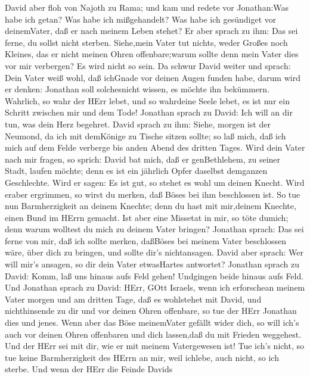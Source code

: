  David aber floh von Najoth zu Rama; und kam und redete vor
Jonathan:Was habe ich getan? Was habe ich mißgehandelt? Was habe ich
gesündiget vor deinemVater, daß er nach meinem Leben stehet?
 Er aber sprach zu ihm: Das sei ferne, du sollst nicht
sterben. Siehe,mein Vater tut nichts, weder Großes noch Kleines, das er
nicht meinen Ohren offenbare;warum sollte denn mein Vater dies vor mir
verbergen? Es wird nicht so sein.  Da schwur David weiter
und sprach: Dein Vater weiß wohl, daß ichGnade vor deinen Augen funden
habe, darum wird er denken: Jonathan soll solchesnicht wissen, es möchte
ihn bekümmern. Wahrlich, so wahr der HErr lebet, und so wahrdeine Seele
lebet, es ist nur ein Schritt zwischen mir und dem Tode! 
Jonathan sprach zu David: Ich will an dir tun, was dein Herz begehret.
 David sprach zu ihm: Siehe, morgen ist der Neumond, da ich
mit demKönige zu Tische sitzen sollte; so laß mich, daß ich mich auf dem
Felde verberge bis anden Abend des dritten Tages.  Wird dein
Vater nach mir fragen, so sprich: David bat mich, daß er genBethlehem,
zu seiner Stadt, laufen möchte; denn es ist ein jährlich Opfer daselbst
demganzen Geschlechte.  Wird er sagen: Es ist gut, so stehet
es wohl um deinen Knecht. Wird eraber ergrimmen, so wirst du merken, daß
Böses bei ihm beschlossen ist.  So tue nun Barmherzigkeit an
deinem Knechte; denn du hast mit mir,deinem Knechte, einen Bund im HErrn
gemacht. Ist aber eine Missetat in mir, so töte dumich; denn warum
wolltest du mich zu deinem Vater bringen?  Jonathan sprach:
Das sei ferne von mir, daß ich sollte merken, daßBöses bei meinem Vater
beschlossen wäre, über dich zu bringen, und sollte dir's nichtansagen.
 David aber sprach: Wer will mir's ansagen, so dir dein
Vater etwasHartes antwortet?  Jonathan sprach zu David:
Komm, laß uns hinaus aufs Feld gehen! Undgingen beide hinaus aufs Feld.
 Und Jonathan sprach zu David: HErr, GOtt Israels, wenn ich
erforschean meinem Vater morgen und am dritten Tage, daß es wohlstehet
mit David, und nichthinsende zu dir und vor deinen Ohren offenbare,
 so tue der HErr Jonathan dies und jenes. Wenn aber das
Böse meinemVater gefällt wider dich, so will ich's auch vor deinen Ohren
offenbaren und dich lassen,daß du mit Frieden weggehest. Und der HErr
sei mit dir, wie er mit meinem Vatergewesen ist!  Tue ich's
nicht, so tue keine Barmherzigkeit des HErrn an mir, weil ichlebe, auch
nicht, so ich sterbe.  Und wenn der HErr die Feinde Davids
